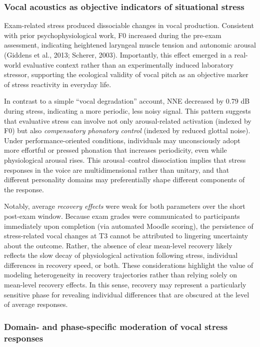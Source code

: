 \documentclass[
  english,
  man]{apa6}
\begin{document}
\subsubsection{Vocal acoustics as objective indicators of situational stress}\label{vocal-acoustics-as-objective-indicators-of-situational-stress}

Exam-related stress produced dissociable changes in vocal production. Consistent with prior psychophysiological work, F0 increased during the pre-exam assessment, indicating heightened laryngeal muscle tension and autonomic arousal (Giddens et al., 2013; Scherer, 2003). Importantly, this effect emerged in a real-world evaluative context rather than an experimentally induced laboratory stressor, supporting the ecological validity of vocal pitch as an objective marker of stress reactivity in everyday life.

In contrast to a simple ``vocal degradation'' account, NNE decreased by 0.79 dB during stress, indicating a more periodic, less noisy signal. This pattern suggests that evaluative stress can involve not only arousal-related activation (indexed by F0) but also \emph{compensatory phonatory control} (indexed by reduced glottal noise). Under performance-oriented conditions, individuals may unconsciously adopt more effortful or pressed phonation that increases periodicity, even while physiological arousal rises. This arousal--control dissociation implies that stress responses in the voice are multidimensional rather than unitary, and that different personality domains may preferentially shape different components of the response.

Notably, average \emph{recovery effects} were weak for both parameters over the short post-exam window. Because exam grades were communicated to participants immediately upon completion (via automated Moodle scoring), the persistence of stress-related vocal changes at T3 cannot be attributed to lingering uncertainty about the outcome. Rather, the absence of clear mean-level recovery likely reflects the slow decay of physiological activation following stress, individual differences in recovery speed, or both. These considerations highlight the value of modeling heterogeneity in recovery trajectories rather than relying solely on mean-level recovery effects. In this sense, recovery may represent a particularly sensitive phase for revealing individual differences that are obscured at the level of average responses.

\subsubsection{Domain- and phase-specific moderation of vocal stress responses}\label{domain--and-phase-specific-moderation-of-vocal-stress-responses}
\end{document}
